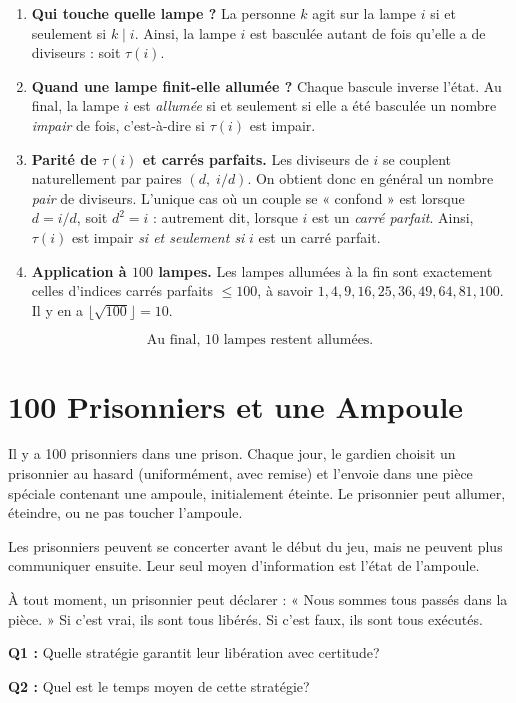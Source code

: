 \begin{enumerate}
  \item \textbf{Qui touche quelle lampe ?} 
  La personne $k$ agit sur la lampe $i$ si et seulement si  $k\mid i$. 
  Ainsi, la lampe $i$ est basculée autant de fois qu’elle a de diviseurs : soit $\tau(i)$.

  \item \textbf{Quand une lampe finit-elle allumée ?}
  Chaque bascule inverse l’état. Au final, la lampe $i$ est \emph{allumée} si et seulement si elle a été basculée un nombre \emph{impair} de fois, c’est-à-dire si $\tau(i)$ est impair.

  \item \textbf{Parité de $\tau(i)$ et carrés parfaits.}
  Les diviseurs de $i$ se couplent naturellement par paires $(d,\; i/d)$. 
  On obtient donc en général un nombre \emph{pair} de diviseurs. 
  L’unique cas où un couple se « confond » est lorsque $d=i/d$, soit $d^2=i$ : autrement dit, lorsque $i$ est un \emph{carré parfait}. 
  Ainsi, $\tau(i)$ est impair \emph{si et seulement si} $i$ est un carré parfait.

  \item \textbf{Application à $100$ lampes.}
  Les lampes allumées à la fin sont exactement celles d’indices carrés parfaits $\le 100$, 
  à savoir $1,4,9,16,25,36,49,64,81,100$. 
  Il y en a $\lfloor \sqrt{100}\rfloor = 10$.
\end{enumerate}

\[
\boxed{\,\text{Au final, } 10 \text{ lampes restent allumées.}\,}
\]

\section{100 Prisonniers et une Ampoule}

\begin{exerciseBox}
Il y a 100 prisonniers dans une prison. Chaque jour, le gardien choisit un prisonnier au hasard (uniformément, avec remise) et l'envoie dans une pièce spéciale contenant une ampoule, initialement éteinte. Le prisonnier peut allumer, éteindre, ou ne pas toucher l'ampoule.

Les prisonniers peuvent se concerter avant le début du jeu, mais ne peuvent plus communiquer ensuite. Leur seul moyen d'information est l'état de l'ampoule.

À tout moment, un prisonnier peut déclarer : « Nous sommes tous passés dans la pièce. » Si c'est vrai, ils sont tous libérés. Si c'est faux, ils sont tous exécutés.

\textbf{Q1 :} Quelle stratégie garantit leur libération avec certitude?

\textbf{Q2 :} Quel est le temps moyen de cette stratégie?
\end{exerciseBox}



